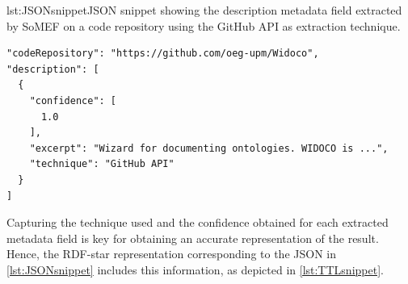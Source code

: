 \noindent\hspace{0.1\linewidth}\begin{minipage}{0.8\linewidth}
\begin{captionedlisting}{lst:JSONsnippet}{JSON snippet showing the description metadata field extracted by SoMEF on a code repository using the GitHub API as extraction technique.}
\centering
\hspace{3em}
{
\begin{lstlisting}[basicstyle=\ttfamily\small,label={list:example1},columns=flexible]
"codeRepository": "https://github.com/oeg-upm/Widoco",
"description": [ 
  {
    "confidence": [
      1.0
    ],
    "excerpt": "Wizard for documenting ontologies. WIDOCO is ...",
    "technique": "GitHub API"
  }
]  
\end{lstlisting}
}
\end{captionedlisting}
\end{minipage}

Capturing the technique used and the confidence obtained for each extracted metadata field is key for obtaining an accurate representation of the result. Hence, the \mbox{RDF-star} representation corresponding to the JSON in \cref{lst:JSONsnippet} includes this information, as depicted in \cref{lst:TTLsnippet}.



